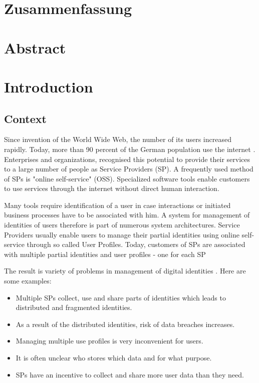 \documentclass[
     12pt,         %
     a4paper,      %
     BCOR=10mm,version=first,     %
     DIV=14,version=first,        %
     ]{scrreprt}
\begin{document}
\chapter*{Zusammenfassung}

\newpage

\chapter*{Abstract}

\newpage

\tableofcontents
\cleardoublepage
{}

\chapter{Introduction}

\section{Context}
Since invention of the World Wide Web, the number of its users increased rapidly. Today, more than 90 percent of the German population use the internet \cite{Onlinestudie}. Enterprises and organizations, recognised this potential to provide their services to a large number of people as Service Providers (SP). A frequently used method of SPs is "online self-service" (OSS). Specialized software tools enable customers to use services through the internet without direct human interaction.

Many tools require identification of a user in case interactions or initiated business processes have to be associated with him. A system for management of identities of users therefore is part of numerous system architectures. Service Providers usually enable users to manage their partial identities using online self-service through so called User Profiles. Today, customers of SPs are associated with multiple partial identities and user profiles - one for each SP

The result is variety of problems in management of digital identities \cite{IdentityCrisis}. Here are some examples:
\begin{itemize}
    \item Multiple SPs collect, use and share parts of identities which leads to distributed and fragmented identities.
    \item As a result of the distributed identities, risk of data breaches increases.
    \item Managing multiple use profiles is very inconvenient for users.
    \item It is often unclear who stores which data and for what purpose.
    \item SPs have an incentive to collect and share more user data than they need.
\end{itemize}
\end{document}
